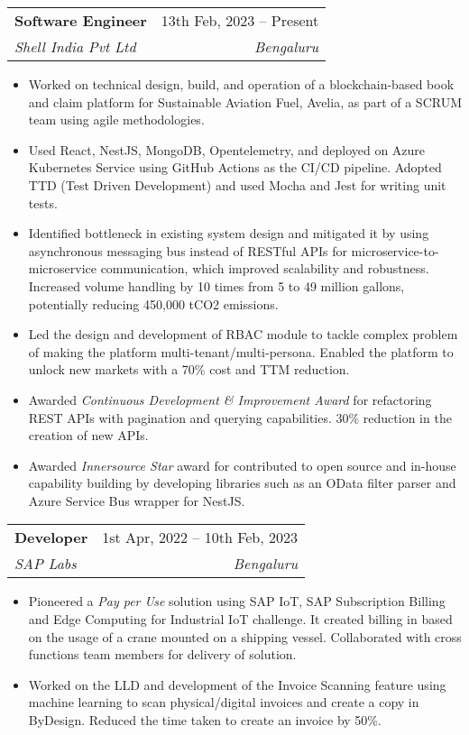 \documentclass[letterpaper,11pt]{article}
\makeatletter
\newcommand{\resumeItem}[1]{
  \item\small{
    {#1 \vspace{-2pt}}
  }
}
\newcommand{\resumeSubheading}[4]{
  \vspace{-2pt}\item
    \begin{tabular*}{0.97\textwidth}[t]{l@{\extracolsep{\fill}}r}
      \textbf{#1} & #2 \\
      \textit{\small#3} & \textit{\small #4} \\
    \end{tabular*}\vspace{-7pt}
}
\newcommand{\resumeSubSubheading}[2]{
    \item
    \begin{tabular*}{0.97\textwidth}{l@{\extracolsep{\fill}}r}
      \textit{\small#1} & \textit{\small #2} \\
    \end{tabular*}\vspace{-7pt}
}
\newcommand{\resumeSubHeadingListEnd}{\end{itemize}}
\newcommand{\resumeItemListStart}{\begin{itemize}}
\newcommand{\resumeItemListEnd}{\end{itemize}\vspace{-5pt}}
\makeatother
\begin{document}
    \resumeSubheading
      {Software Engineer}{13th Feb, 2023 -- Present}
      {Shell India Pvt Ltd}{Bengaluru}
      \resumeItemListStart
        \resumeItem{Worked on technical design, build, and operation of a blockchain-based book and claim platform for Sustainable Aviation Fuel, Avelia, as part of a SCRUM team using agile methodologies.}
        \resumeItem{Used React, NestJS, MongoDB, Opentelemetry, and deployed on Azure Kubernetes Service using GitHub Actions as the CI/CD pipeline. Adopted TTD (Test Driven Development) and used Mocha and Jest for writing unit tests.}
        \resumeItem{Identified bottleneck in existing system design and mitigated it by using asynchronous messaging bus instead of RESTful APIs for microservice-to-microservice communication, which improved scalability and robustness. Increased volume handling by 10 times from 5 to 49 million gallons, potentially reducing 450,000 tCO2 emissions.}
        \resumeItem{Led the design and development of RBAC module to tackle complex problem of making the platform multi-tenant/multi-persona. Enabled the platform to unlock new markets with a 70\% cost and TTM reduction.}
        \resumeItem{Awarded \emph{Continuous Development \& Improvement Award} for refactoring REST APIs with pagination and querying capabilities. 30\% reduction in the creation of new APIs. }
        \resumeItem{Awarded \emph{Innersource Star} award for contributed to open source and in-house capability building by developing libraries such as an OData filter parser and Azure Service Bus wrapper for NestJS.}
      \resumeItemListEnd
      

    \resumeSubheading
      {Developer}{1st Apr, 2022 -- 10th Feb, 2023}
      {SAP Labs}{Bengaluru}
      \resumeItemListStart
        \resumeItem{Pioneered a \emph{Pay per Use} solution using SAP IoT, SAP Subscription Billing and Edge Computing for Industrial IoT challenge. It created billing in based on the usage of a crane mounted on a shipping vessel. Collaborated with cross functions team members for delivery of solution.}
        \resumeItem{Worked on the LLD and development of the Invoice Scanning feature using machine learning to scan physical/digital invoices and create a copy in ByDesign. Reduced the time taken to create an invoice by 50\%.}
    \resumeItemListEnd
\end{document}
